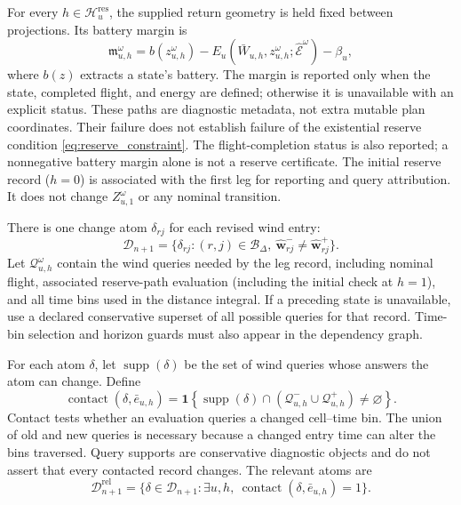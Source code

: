 For every $h\in\mathcal H_u^{\mathrm{res}}$, the supplied return geometry
is held fixed between projections. Its battery margin is
\begin{equation}
\mathfrak m_{u,h}^{\omega}
=b(z_{u,h}^{\omega})
-E_u(\bar W_{u,h},z_{u,h}^{\omega};\widehat{\mathcal E}^{\omega})
-\beta_u,
\label{eq:diagnostic_reserve_margin}
\end{equation}
where $b(z)$ extracts a state's battery. The margin is reported only when
the state, completed flight, and energy are defined; otherwise
it is unavailable with an explicit status. These paths are diagnostic
metadata, not extra mutable plan coordinates. Their failure does not
establish failure of the existential reserve condition
\eqref{eq:reserve_constraint}.
The flight-completion status is also reported; a nonnegative battery
margin alone is not a reserve
certificate. The initial reserve record
($h=0$) is associated with the first leg for reporting and query attribution.
It does not change $Z_{u,1}^{\omega}$ or any nominal transition.

There is one change atom $\delta_{rj}$ for each revised wind entry:
\begin{equation}
\mathcal D_{n+1}=\{\delta_{rj}:(r,j)\in\mathcal B_\Delta,\
\widehat{\mathbf w}_{rj}^{-}\ne\widehat{\mathbf w}_{rj}^{+}\}.
\label{eq:wind_atoms}
\end{equation}
Let $\mathcal Q_{u,h}^{\omega}$ contain the wind queries needed by the leg
record, including nominal flight, associated reserve-path evaluation
(including the initial check at $h=1$), and all time bins used in the
distance integral. If a preceding state is unavailable, use a declared
conservative superset of all possible queries for that record. Time-bin
selection and horizon guards must also appear in the dependency graph.

For each atom $\delta$, let $\operatorname{supp}(\delta)$ be the set of
wind queries whose answers the atom can change. Define
\begin{equation}
\operatorname{contact}(\delta,\bar e_{u,h})
=\mathbf 1\!\left\{
\operatorname{supp}(\delta)\cap
(\mathcal Q_{u,h}^{-}\cup\mathcal Q_{u,h}^{+})\ne\varnothing\right\}.
\label{eq:contact}
\end{equation}
Contact tests whether an evaluation queries a changed cell--time bin.
The union of old and new queries is necessary because a changed entry time
can alter the bins traversed. Query supports are conservative diagnostic
objects and do not assert that every contacted record changes.
The relevant atoms are
\begin{equation}
\mathcal D_{n+1}^{\mathrm{rel}}
=\{\delta\in\mathcal D_{n+1}:
\exists u,h,\ \operatorname{contact}(\delta,\bar e_{u,h})=1\}.
\label{eq:relevant_changes}
\end{equation}

